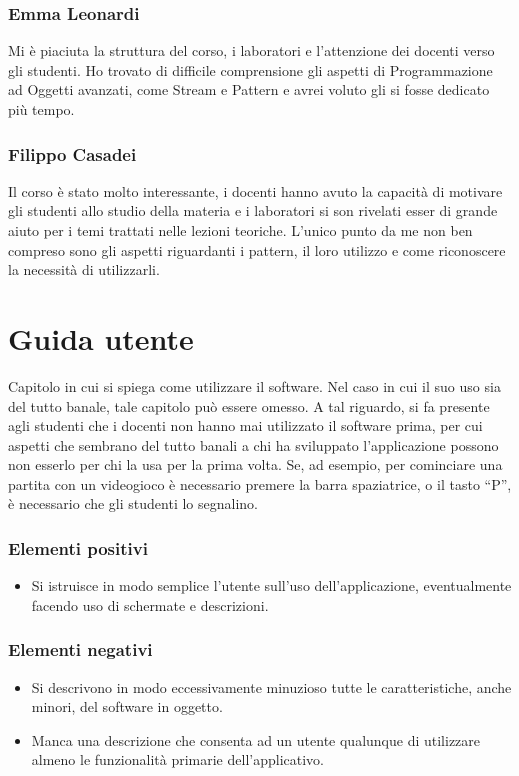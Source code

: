\documentclass[a4paper,12pt]{report}
\begin{document}
\subsection{Emma Leonardi}
Mi è piaciuta la struttura del corso, i laboratori e l'attenzione dei docenti verso gli studenti. 
Ho trovato di difficile comprensione gli aspetti di Programmazione ad Oggetti avanzati, come Stream e Pattern e avrei voluto gli si fosse dedicato più tempo.

\subsection{Filippo Casadei}
Il corso è stato molto interessante, i docenti hanno avuto la capacità di motivare gli studenti allo studio della materia e i laboratori si son rivelati esser di grande aiuto per i temi trattati nelle lezioni teoriche.
L'unico punto da me non ben compreso sono gli aspetti riguardanti i pattern, il loro utilizzo e come riconoscere la necessità di utilizzarli.

\appendix
\chapter{Guida utente}

Capitolo in cui si spiega come utilizzare il software. Nel caso in cui il suo uso sia del tutto
banale, tale capitolo può essere omesso.
%
A tal riguardo, si fa presente agli studenti che i docenti non hanno mai utilizzato il software
prima, per cui aspetti che sembrano del tutto banali a chi ha sviluppato l'applicazione possono non
esserlo per chi la usa per la prima volta.
%
Se, ad esempio, per cominciare una partita con un videogioco è necessario premere la barra
spaziatrice, o il tasto ``P'', è necessario che gli studenti lo segnalino.

\subsection*{Elementi positivi}

\begin{itemize}
	\item Si istruisce in modo semplice l'utente sull'uso dell'applicazione, eventualmente facendo uso di schermate e descrizioni.
\end{itemize}

\subsection*{Elementi negativi}
\begin{itemize}
	\item Si descrivono in modo eccessivamente minuzioso tutte le caratteristiche, anche minori, del software in oggetto.
	\item Manca una descrizione che consenta ad un utente qualunque di utilizzare almeno le funzionalità primarie dell'applicativo.
\end{itemize}
\end{document}
